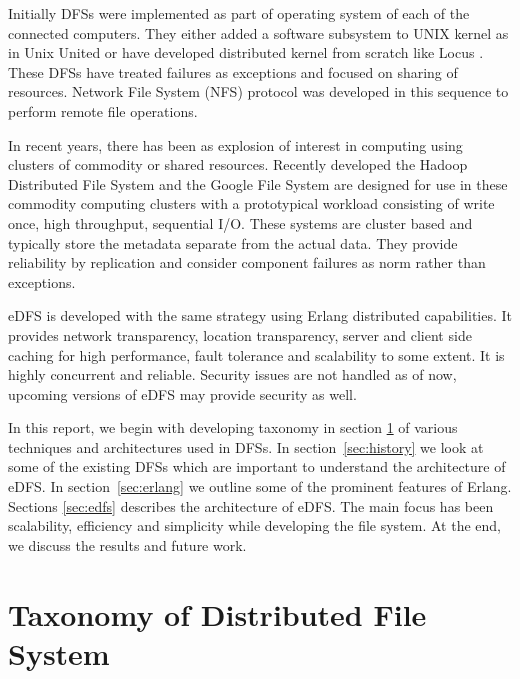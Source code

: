 \documentclass[a4paper,12pt]{article}
\begin{document}
Initially DFSs were implemented as part of operating system of each of the connected computers. They either added a software subsystem to UNIX kernel as in Unix United \cite[p.~342]{old_dfs}  or have developed distributed kernel from scratch like Locus \cite[p.~345]{old_dfs}. These DFSs have treated failures as exceptions and focused on sharing of resources. Network File System (NFS) protocol \cite[p.~351]{old_dfs} was developed in this sequence to perform remote file operations.

In recent years, there has been as explosion of interest in computing using clusters of commodity or shared resources. Recently developed the Hadoop Distributed File System \cite{hadoop} and the Google File System \cite{ghemawat03} are designed for use in these commodity computing clusters with a prototypical workload consisting of write once, high throughput, sequential I/O. These systems are cluster based and typically store the metadata separate from the actual data. They provide reliability by replication and consider component failures as norm rather than exceptions.

eDFS is developed with the same strategy using Erlang distributed capabilities. It provides network transparency, location transparency, server and client side caching for high performance, fault tolerance and scalability to some extent. It is highly concurrent and reliable. Security issues are not handled as of now, upcoming versions of eDFS may provide security as well.

In this report, we begin with developing taxonomy in section \ref{sec:texonomy} of various techniques and architectures used in DFSs. In section~\ref{sec:history} we look at some of the existing DFSs which are important to understand the architecture of eDFS. In section~\ref{sec:erlang} we outline some of the prominent features of Erlang. Sections \ref{sec:edfs} describes the architecture of eDFS. The main focus has been scalability, efficiency and simplicity while developing the file system. At the end, we discuss the results and future work.

\section{Taxonomy of Distributed File System}
\label{sec:texonomy}
\end{document}
